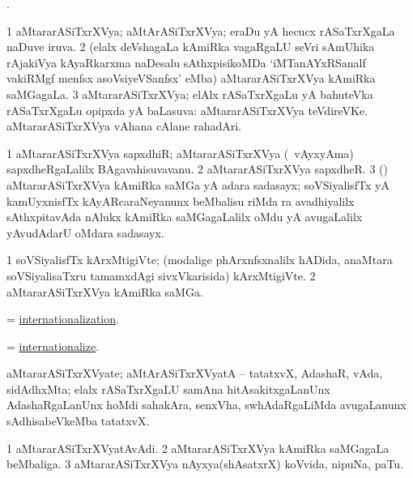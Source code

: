 \bentry
{}
\gl{\saMkiSx}
\bmng
{}. 
\emng
\eentry

\bentry
{}
\gl{\gu}
\bmng
\bnum
\num{1} aMtararASiTxrXVya; aMtArASiTxrXVya; eraDu yA hecucx rASaTxrXgaLa naDuve iruva. 
\num{2} (elalx deVshagaLa kAmiRka vagaRgaLU seVri sAmUhika rAjakiVya kAyaRkarxma naDesalu sAthxpisikoMDa `iMTanAYxRSanalf vakiRMgf menfsx asoVsiyeVSanfsx' eMba) aMtararASiTxrXVya kAmiRka saMGagaLa. 
\num{3} aMtararASiTxrXVya; elAlx rASaTxrXgaLu yA bahuteVka rASaTxrXgaLu opipxda yA baLasuva:  aMtararASiTxrXVya teVdireVKe.  aMtararASiTxrXVya vAhana cAlane rahadAri. 
\enum
\emng
\eentry

\bentry
{}
\gl{\nA}
\bmng
\bnum
\num{1} aMtararASiTxrXVya sapxdhiR; aMtararASiTxrXVya (\sA\ vAyxyAma) sapxdheRgaLalilx BAgavahisuvavanu. 
\num{2} aMtararASiTxrXVya sapxdheR. 
\num{3} () aMtararASiTxrXVya kAmiRka saMGa yA adara sadasayx; soVSiyalisfTx yA kamUyxnisfTx kAyARcaraNeyanunx beMbalisu  riMda ra avadhiyalilx sAthxpitavAda nAlukx kAmiRka saMGagaLalilx oMdu yA avugaLalilx yAvudAdarU oMdara sadasayx. 
\enum
\emng
\eentry

\bentry
{}
\gl{\nA}
\bmng
\bnum
\num{1} soVSiyalisfTx kArxMtigiVte; (modalige phArxnfsxnalilx hADida, anaMtara soVSiyalisaTxru tamamxdAgi sivxVkarisida) kArxMtigiVte. 
\num{2} aMtararASiTxrXVya kAmiRka saMGa. 
\enum
\emng
\eentry

\bentry
{}
\gl{\nA}
\bmng
= \hyperlink{internationalization}{internationalization}. 
\emng
\eentry

\bentry
{}
\gl{\sakirx}
\bmng
= \hyperlink{internationalize}{internationalize}. 
\emng
\eentry

\bentry
{}
\gl{\nA}
\bmng
aMtararASiTxrXVyate; aMtArASiTxrXVyatA -- tatatxvX, AdashaR, vAda, sidAdhxMta; elalx rASaTxrXgaLU samAna hitAsakitxgaLanUnx AdashaRgaLanUnx hoMdi sahakAra, senxVha, swhAdaRgaLiMda avugaLanunx sAdhisabeVkeMba tatatxvX. 
\emng
\eentry

\bentry
{}
\gl{\nA}
\bmng
\bnum
\num{1} aMtararASiTxrXVyatAvAdi. 
\num{2} aMtararASiTxrXVya kAmiRka saMGagaLa beMbaliga. 
\num{3} aMtararASiTxrXVya nAyxya(shAsatxrX) koVvida, nipuNa, paTu. 
\enum
\emng
\eentry

